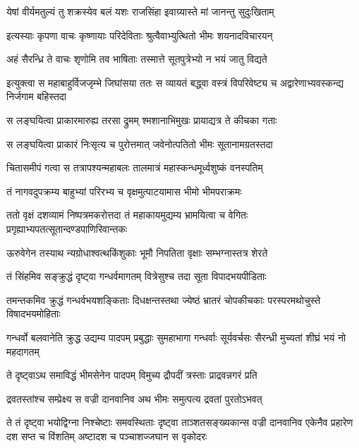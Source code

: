 \twolineshloka
{येषां वीर्यमतुल्यं तु शक्रस्येव बलं यशः}
{राजसिंहा इवाग्र्यास्ते मां जानन्तु सुदुःखिताम्}


\twolineshloka
{इत्यस्याः कृपणा वाचः कृष्णायाः परिदेविताः}
{श्रुत्वैवाभ्युत्थितो भीमः शयनादविचारयन्}




\twolineshloka
{अहं सैरन्ध्रि ते वाचः शृणोमि तव भाषिताः}
{तस्मात्ते सूतपुत्रेभ्यो न भयं जातु विद्यते}



\onelineshloka
{इत्युक्त्वा स महाबाहुर्विजजृम्भे जिघांसया}
\twolineshloka
{ततः स व्यायतं बद्ध्वा वस्त्रं विपरिवेष्ट्य च}
{अद्वारेणाभ्यवस्कन्द्य निर्जगाम बहिस्तदा}


\twolineshloka
{स लङ्घयित्वा प्राकारमारुह्य तरसा द्रुमम्}
{श्मशानाभिमुखः प्रायाद्यत्र ते कीचका गताः}


\twolineshloka
{स लङ्घयित्वा प्राकारं निःसृत्य च पुरोत्तमात्}
{जवेनोत्पतितो भीमः सूतानामग्रतस्तदा}


\twolineshloka
{चितासमीपं गत्वा स तत्रापश्यन्महाबलः}
{तालमात्रं महास्कन्धमूर्ध्वशुष्कं वनस्पतिम्}


\twolineshloka
{तं नागवदुपक्रम्य बाहुभ्यां परिरभ्य च}
{वृक्षमुत्पाटयामास भीमो भीमपराक्रमः}


\onelineshloka
{ततो वृक्षं दशव्यामं निष्पत्रमकरोत्तदा}
\twolineshloka
{तं महाकायमुद्यम्य भ्रामयित्वा च वेगितः}
{प्रगृह्याभ्यपतत्सूतान्दण्डपाणिरिवान्तकः}


\twolineshloka
{ऊरुवेगेन तस्याथ न्यग्रोधाश्वत्थकिंशुकाः}
{भूमौ निपतिता वृक्षाः सम्भग्नास्तत्र शेरते}


\twolineshloka
{तं सिंहमिव सङ्क्रुद्धं दृष्ट्वा गन्धर्वमागतम्}
{वित्रेसुश्च तदा सूता विपादभयपीडिताः}


\threelineshloka
{तमन्तकमिव क्रुद्धं गन्धर्वभयशङ्किताः}
{दिधक्षन्तस्तथा ज्येष्ठं भ्रातरं चोपकीचकाः}
{परस्परमथोचुस्ते विषादभयमोहिताः}


\threelineshloka
{गन्धर्वो बलवानेति क्रुद्ध उद्यम्य पादपम्}
{प्रबुद्धाः सुमहाभागा गन्धर्वाः सूर्यवर्चसः}
{सैरन्ध्री मुच्यतां शीघ्रं भयं नो महदागतम्}



\twolineshloka
{ते दृष्ट्वाऽथ समाविद्धं भीमसेनेन पादपम्}
{विमुच्य द्रौपदीं त्रस्ताः प्राद्रवन्नगरं प्रति}


\twolineshloka
{द्रवतस्तांश्च सम्प्रेक्ष्य स वज्री दानवानिव}
{अथ भीमः समुत्पत्य द्रवतां पुरतोऽभवत्}


\onelineshloka
{ते तं दृष्ट्वा भयोद्विग्ना निश्चेष्टाः समवस्थिताः}
\threelineshloka
{दृष्ट्वा ताञ्शतसङ्ख्यकान्स वज्री दानवानिव}
{एकेनैव प्रहारेण दश सप्त च विंशतिम्}
{अष्टादश च पञ्चाशज्जघान स वृकोदरः}


